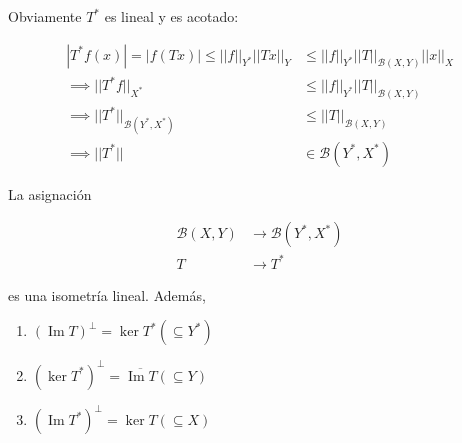  Obviamente $T^*$ es lineal y es acotado:

 \begin{align*}
    |T^*f(x)|=|f(Tx)|\leq ||f||_{Y^*}||Tx||_{Y}&\leq ||f||_{Y^*}||T||_{\mathcal{B}(X,Y)}||x||_X\\
    \implies ||T^*f||_{X^*}&\leq ||f||_{Y^*}||T||_{\mathcal{B}(X,Y)}\\
    \implies ||T^*||_{\mathcal{B}(Y^*,X^*)}&\leq ||T||_{\mathcal{B}(X,Y)}\\
    \implies ||T^*||&\in\mathcal{B}(Y^*,X^*)
 \end{align*}

 \begin{ftheorem}
    La asignación 

    \begin{align*}
        \mathcal{B}(X,Y)&\to \mathcal{B}(Y^*,X^*)\\
        T&\to T^*
    \end{align*}

    es una isometría lineal. Además,

    \begin{enumerate}[label=(\alph*)]
        \item $(\operatorname{Im} T)^\perp=\ker T^* (\subseteq Y^*)$
        \item $(\ker T^*)^\perp=\overline{\operatorname{Im}T} (\subseteq Y)$
        \item $(\operatorname{Im}T^*)^\perp=\ker T (\subseteq X)$
    \end{enumerate}
 \end{ftheorem}

